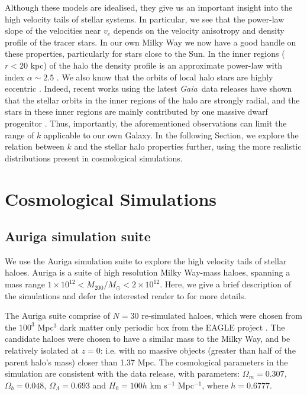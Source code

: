 \documentclass[fleqn,usenatbib]{mnras}
\newcommand{\gaia}		{\emph{Gaia}}
\begin{document}
Although these models are idealised, they give us an important insight into the high velocity tails of stellar systems. In particular, we see that the power-law slope of the velocities near $v_e$ depends on the velocity anisotropy and density profile of the tracer stars. In our own Milky Way we now have a good handle on these properties, particularly for stars close to the Sun. In the inner regions ($r < 20$ kpc) of the halo the density profile is an approximate power-law with index $\alpha \sim 2.5$ \citep[e.g.][]{deason11b, sesar11, faccioli14, pila15}. We also know that the orbits of local halo stars are highly eccentric \citep[$\beta =0.7$][]{smith09, bond10}. Indeed, recent works using the latest \gaia\ data releases have shown that the stellar orbits in the inner regions of the halo are strongly radial, and the stars in these inner regions are mainly contributed by one massive dwarf progenitor \citep{belokurov18, helmi18}. Thus, importantly, the aforementioned observations can limit the range of $k$ applicable to our own Galaxy. In the following Section, we explore the relation between $k$ and the stellar halo properties further, using the more realistic distributions present in cosmological simulations.

\section{Cosmological Simulations}
\label{sec:sims}

\subsection{Auriga simulation suite}
We use the Auriga simulation suite to explore the high velocity tails of stellar haloes. Auriga is a suite of high resolution Milky Way-mass haloes, spanning a mass range $1 \times 10^{12} <M_{200}/M_\odot < 2\times 10^{12}$. Here, we give a brief description of the simulations and defer the interested reader to \cite{grand17} for more details.

The Auriga suite comprise of $N=30$ re-simulated haloes, which were chosen from the $100^3$ Mpc$^3$ dark matter only periodic box from the EAGLE project \citep{crain15, schaye15}. The candidate haloes were chosen to have a similar mass to the Milky Way, and be relatively isolated at $z=0$: i.e. with no massive objects (greater than half of the parent halo's mass) closer than 1.37 Mpc. The cosmological parameters in the simulation are consistent with the \cite{planck14} data release, with parameters: $\Omega_m = 0.307$, $\Omega_b = 0.048$, $\Omega_\Lambda = 0.693$ and $H_0 = 100 h$ km s$^{-1}$ Mpc$^{-1}$, where $h = 0.6777$.
\end{document}
